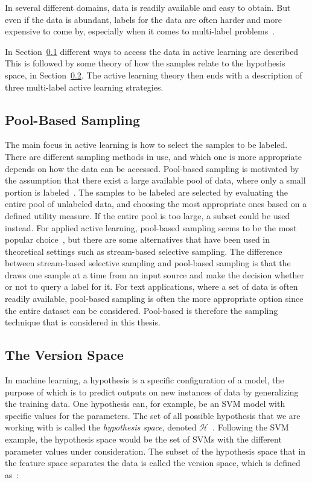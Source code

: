 In several different domains, data is readily available and easy to obtain.
But even if the data is abundant, labels for the data are often harder and more expensive to come by, especially when it comes to multi-label problems~\cite{settles2012active}.

In Section~\ref{sec:pool-based-sampling} different ways to access the data in active learning are described
This is followed by some theory of how the samples relate to the hypothesis space, in Section~\ref{sec:the-version-space}.
The active learning theory then ends with a description of three multi-label active learning strategies.

\subsection{Pool-Based Sampling}
\label{sec:pool-based-sampling}

The main focus in active learning is how to select the samples to be labeled.
There are different sampling methods in use, and which one is more appropriate depends on how the data can be accessed.
Pool-based sampling is motivated by the assumption that there exist a large available pool of data, where only a small portion is labeled~\cite{lewis1994sequential, settles2012active}.
The samples to be labeled are selected by evaluating the entire pool of unlabeled data, and choosing the most appropriate ones based on a defined utility measure.
If the entire pool is too large, a subset could be used instead.
For applied active learning, pool-based sampling seems to be the most popular choice~\cite{li2013active}, but there are some alternatives that have been used in theoretical settings such as stream-based selective sampling.
The difference between stream-based selective sampling and pool-based sampling is that the draws one sample at a time from an input source and make the decision whether or not to query a label for it.
For text applications, where a set of data is often readily available, pool-based sampling is often the more appropriate option since the entire dataset can be considered.
Pool-based is therefore the sampling technique that is considered in this thesis.

\subsection{The Version Space}
\label{sec:the-version-space}

In machine learning, a hypothesis is a specific configuration of a model, the purpose of which is to predict outputs on new instances of data by generalizing the training data.
One hypothesis can, for example, be an SVM model with specific values for the parameters.
The set of all possible hypothesis that we are working with is called the \textit{hypothesis space}, denoted $\mathcal{H}$~\cite{russell2016artificial}.
Following the SVM example, the hypothesis space would be the set of SVMs with the different parameter values under consideration.
The subset of the hypothesis space that in the feature space separates the data is called the version space, which is defined as~\cite{settles2012active,tong2001support}:

